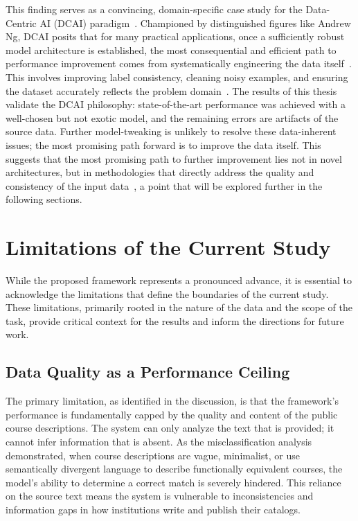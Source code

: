 This finding serves as a convincing, domain-specific case study for the Data-Centric AI (DCAI) paradigm~\cite{zha2023datacentricartificialintelligencesurvey,wang2025datacentricaicomprehensivesurvey}. Championed by distinguished figures like Andrew Ng, DCAI posits that for many practical applications, once a sufficiently robust model architecture is established, the most consequential and efficient path to performance improvement comes from systematically engineering the data itself~\cite{ngdatacentric_2021,Strickland_2023}. This involves improving label consistency, cleaning noisy examples, and ensuring the dataset accurately reflects the problem domain~\cite{zha2023datacentricartificialintelligencesurvey,ying2025surveydatacentricaitabular}. The results of this thesis validate the DCAI philosophy: state-of-the-art performance was achieved with a well-chosen but not exotic model, and the remaining errors are artifacts of the source data. Further model-tweaking is unlikely to resolve these data-inherent issues; the most promising path forward is to improve the data itself. This suggests that the most promising path to further improvement lies not in novel architectures, but in methodologies that directly address the quality and consistency of the input data~\cite{gauthier2022}, a point that will be explored further in the following sections.

\section{Limitations of the Current Study}\label{ch:5.2}
While the proposed framework represents a pronounced advance, it is essential to acknowledge the limitations that define the boundaries of the current study. These limitations, primarily rooted in the nature of the data and the scope of the task, provide critical context for the results and inform the directions for future work.

\subsection{Data Quality as a Performance Ceiling}\label{ch:5.2.1}
The primary limitation, as identified in the discussion, is that the framework's performance is fundamentally capped by the quality and content of the public course descriptions. The system can only analyze the text that is provided; it cannot infer information that is absent. As the misclassification analysis demonstrated, when course descriptions are vague, minimalist, or use semantically divergent language to describe functionally equivalent courses, the model's ability to determine a correct match is severely hindered. This reliance on the source text means the system is vulnerable to inconsistencies and information gaps in how institutions write and publish their catalogs.

